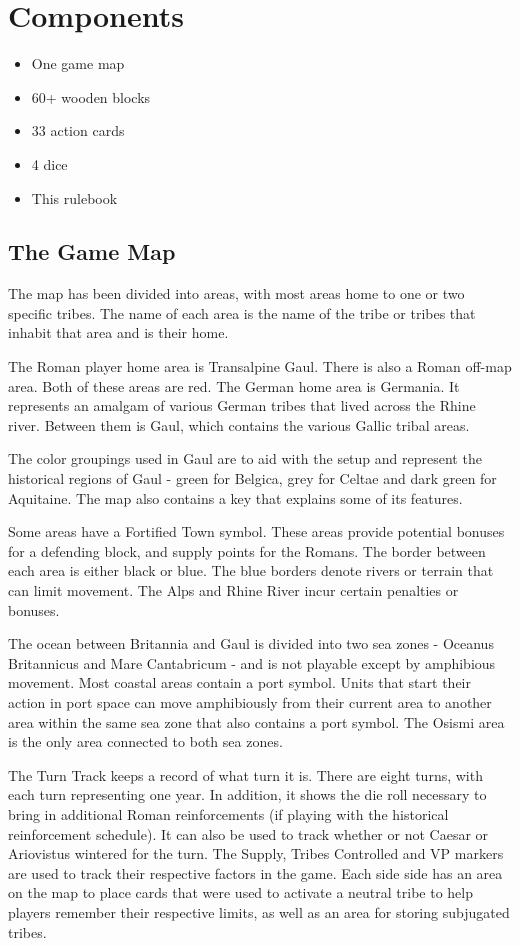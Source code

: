 \section{Components}

\begin{itemize}
  \setlength\itemsep{0em}
  \item One game map
  \item 60+ wooden blocks
  \item 33 action cards
  \item 4 dice
  \item This rulebook
\end{itemize}

\subsection{The Game Map}
The map has been divided into areas, with most areas home to one or two specific tribes. The name of each area is the name of the tribe or tribes that inhabit that area and is their home.

The Roman player home area is Transalpine Gaul. There is also a Roman off-map area. Both of these areas are red. The German home area is Germania. It represents an amalgam of various German tribes that lived across the Rhine river. Between them is Gaul, which contains the various Gallic tribal areas.

The color groupings used in Gaul are to aid with the setup and represent the historical regions of Gaul - green for Belgica, grey for Celtae and dark green for Aquitaine. The map also contains a key that explains some of its features.

Some areas have a Fortified Town symbol. These areas provide potential bonuses for a defending block, and supply points for the Romans. The border between each area is either black or blue. The blue borders denote rivers or terrain that can limit movement. The Alps and Rhine River incur certain penalties or bonuses.

The ocean between Britannia and Gaul is divided into two sea zones - Oceanus Britannicus and Mare Cantabricum - and is not playable except by amphibious movement. Most coastal areas contain a port symbol. Units that start their action in port space can move amphibiously from their current area to another area within the same sea zone that also contains a port symbol. The Osismi area is the only area connected to both sea zones.

The Turn Track keeps a record of what turn it is. There are eight turns, with each turn representing one year. In addition, it shows the die roll necessary to bring in additional Roman reinforcements (if playing with the historical reinforcement schedule). It can also be used to track whether or not Caesar or Ariovistus wintered for the turn. The Supply, Tribes Controlled and VP markers are used to track their respective factors in the game. Each side side has an area on the map to place cards that were used to activate a neutral tribe to help players remember their respective limits, as well as an area for storing subjugated tribes.

